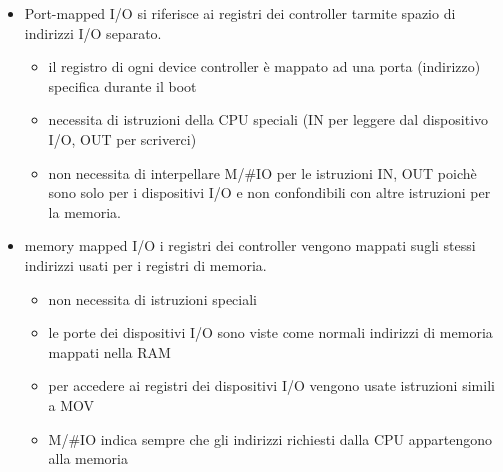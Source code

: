 \documentclass{article}
\begin{document}
    \begin{itemize}
        \item Port-mapped I/O si riferisce ai registri dei controller tarmite spazio di indirizzi I/O separato.
        \begin{itemize}
            \item il registro di ogni device controller è mappato ad una porta (indirizzo) specifica durante il boot
            \item necessita di istruzioni della CPU speciali (IN per leggere dal dispositivo I/O, OUT per scriverci)
            \item non necessita di interpellare M/\#IO per le istruzioni IN, OUT poichè sono solo per i dispositivi I/O e non confondibili con altre istruzioni per la memoria.
        \end{itemize}
        
        \item memory mapped I/O i registri dei controller vengono mappati sugli stessi indirizzi usati per i registri di memoria.
        \begin{itemize}
            \item non necessita di istruzioni speciali
            \item le porte dei dispositivi I/O sono viste come normali indirizzi di memoria mappati nella RAM
            \item per accedere ai registri dei dispositivi I/O vengono usate istruzioni simili a MOV
            \item M/\#IO indica sempre che gli indirizzi richiesti dalla CPU appartengono alla memoria 
        \end{itemize}
    \end{itemize}
\end{document}
